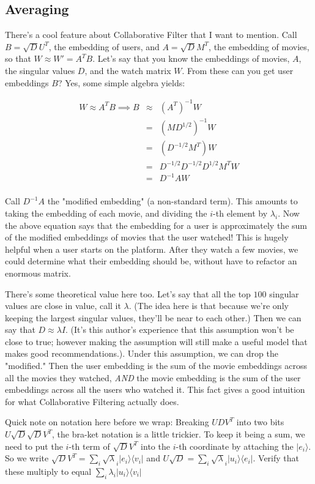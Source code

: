 \documentclass{amsbook}
\begin{document}
\subsection{Averaging}

There's a cool feature about Collaborative Filter that I want to mention.  Call $B=\sqrt DU^T$, the embedding of users, and $A=\sqrt DM^T$, the embedding of movies, so that $W\approx W'=A^TB$.  Let's say that you know the embeddings of movies, $A$, the singular values $D$, and the watch matrix $W$.  From these can you get user embeddings $B$?  Yes, some simple algebra yields:

$$
\begin{array}{rcl}
W\approx A^TB \implies B & \approx & \left(A^T\right)^{-1}W \\
 & = & \left(MD^{1/2}\right)^{-1}W \\
 & = & \left(D^{-1/2}M^T\right)W \\
 & = & D^{-1/2}D^{-1/2}D^{1/2}M^TW \\
 & = & D^{-1}AW \\
\end{array}
$$

Call $D^{-1}A$ the "modified embedding" (a non-standard term).  This amounts to taking the embedding of each movie, and dividing the $i$-th element by $\lambda_i$.  Now the above equation says that the embedding for a user is approximately the sum of the modified embeddings of movies that the user watched!  This is hugely helpful when a user starts on the platform.  After they watch a few movies, we could determine what their embedding should be, without have to refactor an enormous matrix.

There's some theoretical value here too.  Let's say that all the top $100$ singular values are close in value, call it $\lambda$.  (The idea here is that because we're only keeping the largest singular values, they'll be near to each other.)  Then we can say that $D\approx\lambda I$.  (It's this author's experience that this assumption won't be close to true; however making the assumption will still make a useful model that makes good recommendations.). Under this assumption, we can drop the "modified."  Then the user embedding is the sum of the movie embeddings across all the movies they watched, {\em AND} the movie embedding is the sum of the user embeddings across all the users who watched it.  This fact gives a good intuition for what Collaborative Filtering actually does.

Quick note on notation here before we wrap:  Breaking $UDV^T$ into two bits $U\sqrt D\sqrt DV^T$, the bra-ket notation is a little trickier.  To keep it being a sum, we need to put the $i$-th term of $\sqrt DV^T$ into the $i$-th coordinate by attaching the $|e_i\rangle$.  So we write $\sqrt DV^T=\sum_i\sqrt\lambda_i|e_i\rangle\langle v_i|$ and $U\sqrt D=\sum_i\sqrt\lambda_i|u_i\rangle\langle e_i|$.  Verify that these multiply to equal $\sum_i\lambda_i|u_i\rangle\langle v_i|$
\end{document}
